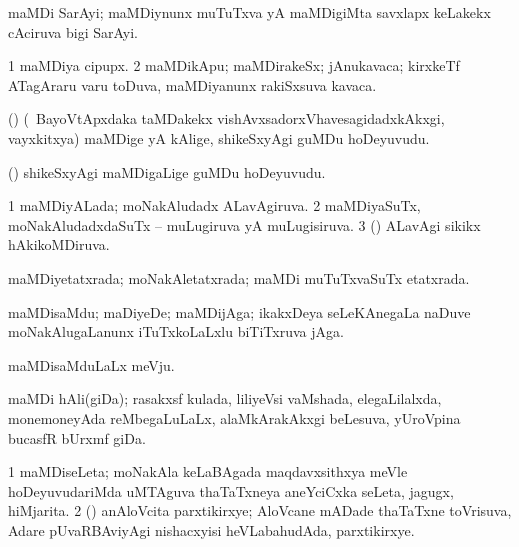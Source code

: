 \bentry
{}
\gl{\nA}
\bmng
maMDi SarAyi; maMDiynunx muTuTxva yA maMDigiMta savxlapx keLakekx cAciruva bigi SarAyi. 
\emng
\eentry

\bentry
{}
\gl{\nA}
\bmng
\bnum
\num{1} maMDiya cipupx. 
\num{2} maMDikApu; maMDirakeSx; jAnukavaca; kirxkeTf ATagAraru \mo varu toDuva, maMDiyanunx rakiSxsuva kavaca. 
\enum
\emng
\eentry

\bentry
{}
\gl{\sakirx}
\bmng
(\AmA) (\kanmu\ BayoVtApxdaka taMDakekx vishAvxsadorxVhavesagidadxkAkxgi, vayxkitxya) maMDige yA kAlige, shikeSxyAgi guMDu hoDeyuvudu. 
\emng
\eentry

\bentry
{}
\gl{\nA}
\bmng
(\AmA) shikeSxyAgi maMDigaLige guMDu hoDeyuvudu. 
\emng
\eentry

\bentry
{}
\gl{\gu}
\bmng
\bnum
\num{1} maMDiyALada; moNakAludadx ALavAgiruva. 
\num{2} maMDiyaSuTx, moNakAludadxdaSuTx -- muLugiruva yA muLugisiruva. 
\num{3} (\rUpa) ALavAgi sikikx hAkikoMDiruva. 
\enum
\emng
\eentry

\bentry
{}
\gl{\gu}
\bmng
maMDiyetatxrada; moNakAletatxrada; maMDi muTuTxvaSuTx etatxrada. 
\emng
\eentry

\bentry
{}
\gl{\nA}
\bmng
maMDisaMdu; maDiyeDe; maMDijAga; ikakxDeya seLeKAnegaLa naDuve moNakAlugaLanunx iTuTxkoLaLxlu biTiTxruva jAga. 
\emng
\eentry

\bentry
{}
\gl{\nA}
\bmng
maMDisaMduLaLx meVju.   
\emng
\eentry

\bentry
{}
\gl{\nA}
\bmng
maMDi hAli(giDa); rasakxsf kulada, liliyeVsi vaMshada, elegaLilalxda, monemoneyAda reMbegaLuLaLx, alaMkArakAkxgi beLesuva, yUroVpina bucasfR bUrxmf giDa. 
\emng
\eentry

\bentry
{}
\gl{\nA}
\bmng
\bnum
\num{1} maMDiseLeta; moNakAla keLaBAgada maqdavxsithxya meVle hoDeyuvudariMda uMTAguva thaTaTxneya aneYciCxka seLeta, jagugx, hiMjarita. 
\num{2} (\rUpa) anAloVcita parxtikirxye; AloVcane mADade thaTaTxne toVrisuva, Adare pUvaRBAviyAgi nishacxyisi heVLabahudAda, parxtikirxye. 
\enum
\emng
\eentry

